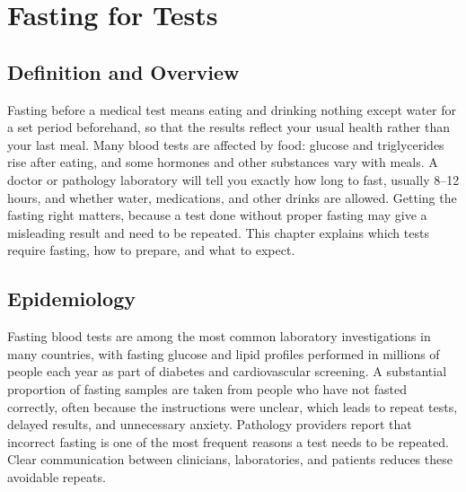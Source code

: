\chapter{Fasting for Tests}

\section*{Definition and Overview}
Fasting before a medical test means eating and drinking nothing except water for a set period beforehand, so that the results reflect your usual health rather than your last meal. Many blood tests are affected by food: glucose and triglycerides rise after eating, and some hormones and other substances vary with meals. A doctor or pathology laboratory will tell you exactly how long to fast, usually 8--12 hours, and whether water, medications, and other drinks are allowed. Getting the fasting right matters, because a test done without proper fasting may give a misleading result and need to be repeated. This chapter explains which tests require fasting, how to prepare, and what to expect.

\section*{Epidemiology}
Fasting blood tests are among the most common laboratory investigations in many countries, with fasting glucose and lipid profiles performed in millions of people each year as part of diabetes and cardiovascular screening. A substantial proportion of fasting samples are taken from people who have not fasted correctly, often because the instructions were unclear, which leads to repeat tests, delayed results, and unnecessary anxiety. Pathology providers report that incorrect fasting is one of the most frequent reasons a test needs to be repeated. Clear communication between clinicians, laboratories, and patients reduces these avoidable repeats.

